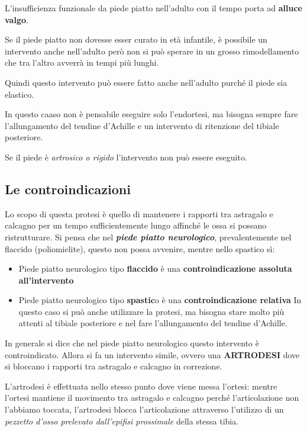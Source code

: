 L'insufficienza funzionale da piede piatto nell'adulto con il tempo porta ad \textbf{alluce valgo}.

Se il piede piatto non dovesse esser curato in età infantile, è possibile un intervento anche nell'adulto però non si può sperare in un grosso rimodellamento che tra l'altro avverrà in tempi più lunghi.

Quindi questo intervento può essere fatto anche nell'adulto purché il piede sia elastico.

In questo caaso non è pensabile eseguire solo l'endortesi, ma bisogna sempre fare l'allungamento del tendine d'Achille e un intervento di ritenzione del tibiale posteriore.

Se il piede è \emph{artrosico o rigido} l'intervento non può essere eseguito.

\subsection{Le controindicazioni}

Lo scopo di questa protesi è quello di mantenere i rapporti tra astragalo e calcagno per un tempo sufficientemente lungo affinché le ossa si possano ristrutturare. Si pensa che nel \textbf{\emph{piede piatto neurologico}}, prevalentemente nel flaccido (poliomielite), questo non possa avvenire, mentre nello spastico sì:

\begin{itemize}
\item
  Piede piatto neurologico tipo \textbf{flaccido} è una \textbf{controindicazione assoluta all'intervento}
\item
  Piede piatto neurologico tipo \textbf{spastic}o è una \textbf{controindicazione relativa} In questo caso si può anche utilizzare la protesi, ma bisogna stare molto più attenti al tibiale posteriore e nel fare l'allungamento del tendine d'Achille.
\end{itemize}

In generale si dice che nel piede piatto neurologico questo intervento è controindicato. Allora si fa un intervento simile, ovvero una \textbf{ARTRODESI} dove si bloccano i rapporti tra astragalo e calcagno in correzione.

L'artrodesi è effettuata nello stesso punto dove viene messa l'ortesi: mentre l'ortesi mantiene il movimento tra astragalo e calcagno perché l'articolazione non l'abbiamo toccata, l'artrodesi blocca l'articolazione attraverso l'utilizzo di un \emph{pezzetto d'osso prelevato dall'epifisi prossimale} della stessa tibia.

